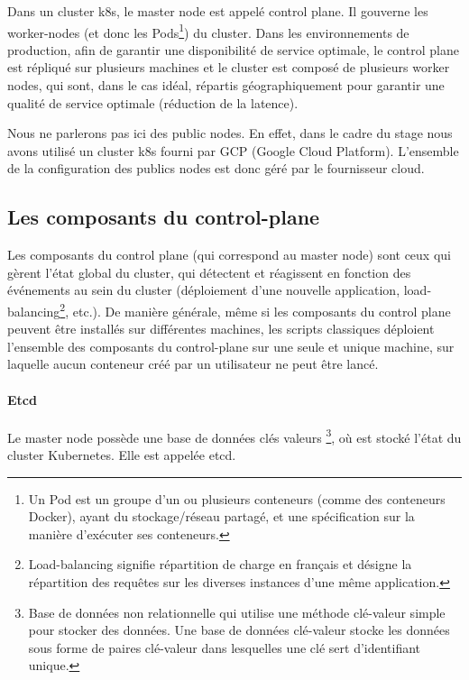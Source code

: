 \documentclass[11pt,fleqn]{book} %
\begin{document}
Dans un cluster k8s, le  master node est appelé control plane. Il gouverne les worker-nodes (et donc les Pods\footnote{Un Pod est un groupe d'un ou plusieurs conteneurs (comme des conteneurs Docker), ayant du stockage/réseau partagé, et une spécification sur la manière d'exécuter ses conteneurs.}) du cluster. Dans les environnements de production, afin de garantir une disponibilité de service optimale, le control plane est répliqué sur plusieurs machines et le cluster est composé de plusieurs worker nodes, qui sont, dans le cas idéal, répartis géographiquement pour garantir une qualité de service optimale (réduction de la latence).\newline

Nous ne parlerons pas ici des public nodes. En effet, dans le cadre du stage nous avons utilisé un cluster k8s fourni par GCP (Google Cloud Platform). L'ensemble de la configuration des publics nodes est donc géré par le fournisseur cloud.


\subsection*{Les composants du control-plane}
Les composants du control plane (qui correspond au master node) sont ceux qui gèrent l'état global du cluster, qui détectent et réagissent en fonction des événements au sein du cluster (déploiement d'une nouvelle application, load-balancing\footnote{Load-balancing signifie répartition de charge en français et désigne la répartition des requêtes sur les diverses instances d'une même application.}, etc.). De manière générale, même si les composants du control plane peuvent être installés sur différentes machines, les scripts classiques déploient l'ensemble des composants du control-plane sur une seule et unique machine, sur laquelle aucun conteneur créé par un utilisateur ne peut être lancé.

\paragraph*{Etcd}
Le master node possède une base de données clés valeurs \footnote{Base de données non relationnelle qui utilise une méthode clé-valeur simple pour stocker des données. Une base de données clé-valeur stocke les données sous forme de paires clé-valeur dans lesquelles une clé sert d'identifiant unique.}, où est stocké l'état du cluster Kubernetes. Elle est appelée etcd.
\end{document}
